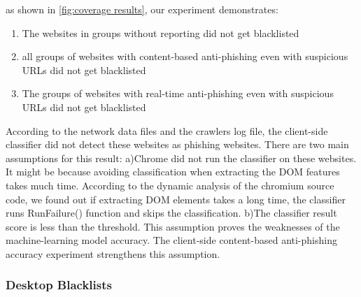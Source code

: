 \documentclass[letterpaper,twocolumn,10pt]{article}
\begin{document}


as shown in \ref{fig:coverage results}, our experiment demonstrates:
\begin{enumerate}
    \item The websites in groups without reporting did not get blacklisted
    \item all groups of websites with content-based anti-phishing even with suspicious URLs did not get blacklisted
    \item The groups of websites with real-time anti-phishing even with suspicious URLs did not get blacklisted
\end{enumerate}
According to the network data files and the crawlers log file, the client-side classifier did not detect these websites as phishing websites. There are two main assumptions for this result:
a)Chrome did not run the classifier on these websites. It might be because avoiding classification when extracting the DOM features takes much time. According to the dynamic analysis of the chromium source code, we found out if extracting DOM elements takes a long time, the classifier runs RunFailure() function and skips the classification.
b)The classifier result score is less than the threshold. This assumption proves the weaknesses of the machine-learning model accuracy.  The client-side content-based anti-phishing accuracy experiment strengthens this assumption.

\subsubsection{Desktop Blacklists}
\end{document}
